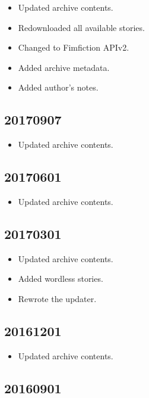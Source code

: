 \documentclass[hidelinks,a4paper,12pt]{article}
\begin{document}
\begin{itemize}
\item Updated archive contents.
\item Redownloaded all available stories.
\item Changed to Fimfiction APIv2.
\item Added archive metadata.
\item Added author's notes.
\end{itemize}

\subsection{20170907}  \label{sec:changelog_20170907}

\begin{itemize}
\item Updated archive contents.
\end{itemize}

\subsection{20170601}  \label{sec:changelog_20170601}

\begin{itemize}
\item Updated archive contents.
\end{itemize}

\subsection{20170301}  \label{sec:changelog_20170301}

\begin{itemize}
\item Updated archive contents.
\item Added wordless stories.
\item Rewrote the updater.
\end{itemize}

\subsection{20161201}  \label{sec:changelog_20161201}

\begin{itemize}
\item Updated archive contents.
\end{itemize}

\subsection{20160901}  \label{sec:changelog_20160901}
\end{document}
